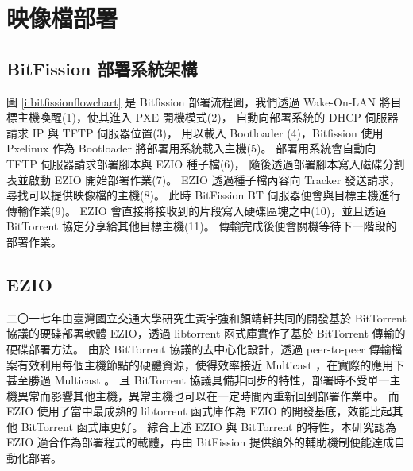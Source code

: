 \section{映像檔部署}
\subsection{BitFission 部署系統架構}



圖 \ref{i:bitfissionflowchart} 是 Bitfission 部署流程圖，我們透過 Wake-On-LAN 將目標主機喚醒(1)，使其進入 PXE 開機模式(2)，
自動向部署系統的 DHCP 伺服器請求 IP 與 TFTP 伺服器位置(3)，
用以載入 Bootloader (4)，Bitfission 使用 Pxelinux 作為 Bootloader 將部署用系統載入主機(5)。
部署用系統會自動向 TFTP 伺服器請求部署腳本與 EZIO 種子檔(6)，
隨後透過部署腳本寫入磁碟分割表並啟動 EZIO 開始部署作業(7)。
EZIO 透過種子檔內容向 Tracker 發送請求，尋找可以提供映像檔的主機(8)。
此時 BitFission BT 伺服器便會與目標主機進行傳輸作業(9)。
EZIO 會直接將接收到的片段寫入硬碟區塊之中(10)，並且透過 BitTorrent 協定分享給其他目標主機(11)。
傳輸完成後便會關機等待下一階段的部署作業。




\subsection{EZIO}
二〇一七年由臺灣國立交通大學研究生黃宇強和顏靖軒共同的開發基於 BitTorrent 協議的硬碟部署軟體 EZIO\cite{ezio}，透過 libtorrent 函式庫實作了基於 BitTorrent 傳輸的硬碟部署方法。
由於 BitTorrent 協議的去中心化設計，透過 peer-to-peer 傳輸檔案有效利用每個主機節點的硬體資源，使得效率接近 Multicast ，在實際的應用下甚至勝過 Multicast 。
且 BitTorrent 協議具備非同步的特性，部署時不受單一主機異常而影響其他主機，異常主機也可以在一定時間內重新回到部署作業中。
而 EZIO 使用了當中最成熟的 libtorrent 函式庫作為 EZIO 的開發基底，效能比起其他 BitTorrent 函式庫更好。
綜合上述 EZIO 與 BitTorrent 的特性，本研究認為 EZIO 適合作為部署程式的載體，再由 BitFission 提供額外的輔助機制便能達成自動化部署。

